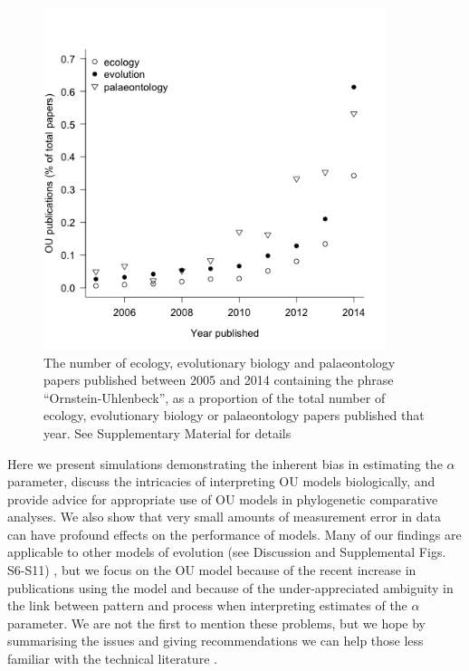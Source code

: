 \documentclass[a4paper,12pt]{article}
\begin{document}
    \begin{figure}[h]
      \centering
      \includegraphics[width=10cm, height=10cm, keepaspectratio=true]{Figures/PapersThruTime.png}
      \caption{The number of ecology, evolutionary biology and palaeontology papers published between 2005 and 2014 containing the phrase ``Ornstein-Uhlenbeck'', as a proportion of the total number of ecology, evolutionary biology or palaeontology papers published that year. See Supplementary Material for details %
      }
      \label{figure.uses}
    \end{figure}

  Here we present simulations demonstrating the inherent bias in estimating the $\alpha$ parameter, discuss the intricacies of interpreting OU models biologically, and provide advice for appropriate use of OU models in phylogenetic comparative analyses. We also show that very small amounts of measurement error in data can have profound effects on the performance of models. 
  Many of our findings are applicable to other models of evolution (see Discussion and Supplemental Figs. S6-S11) 
  , but we focus on the OU model because of the recent increase in publications using the model and because of the under-appreciated ambiguity in the link between pattern and process when interpreting estimates of the $\alpha$ parameter. 
  We are not the first to mention these problems, but we hope by summarising the issues and giving recommendations we can help those less familiar with the technical literature \citep[e.g.,][]{ho2013asymptotic,ho2014intrinsic,boettiger2012your,hansen2012interpreting,ives2010phylogenetic}.
\end{document}

